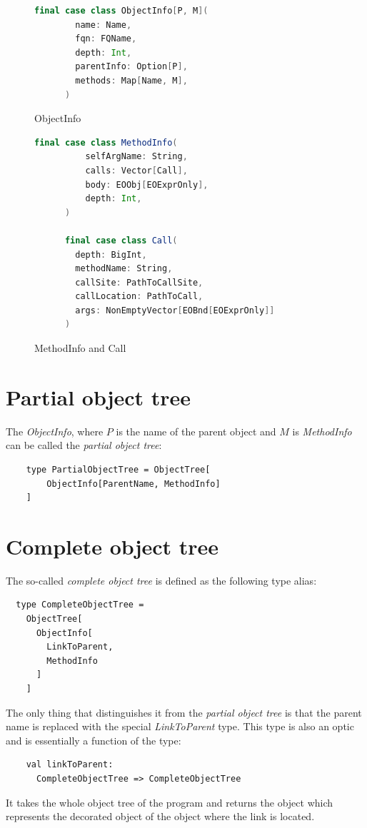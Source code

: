 \begin{figure}
    \begin{lstlisting}[language=Scala]
      final case class ObjectInfo[P, M](
        name: Name,
        fqn: FQName,
        depth: Int,
        parentInfo: Option[P],
        methods: Map[Name, M],
      )
    \end{lstlisting}
    \caption{ObjectInfo}
    \label{fig:objinfo}
\end{figure}

\begin{figure}
    \begin{lstlisting}[language=Scala]
      final case class MethodInfo(
          selfArgName: String,
          calls: Vector[Call],
          body: EOObj[EOExprOnly],
          depth: Int,
      )
          
      final case class Call(
        depth: BigInt,
        methodName: String,
        callSite: PathToCallSite,
        callLocation: PathToCall,
        args: NonEmptyVector[EOBnd[EOExprOnly]]
      )
    \end{lstlisting}
    \caption{MethodInfo and Call}
    \label{fig:methodinfo}
\end{figure}

\section{Partial object tree}
The \textit{ObjectInfo}, where $P$ is the name of the parent object and $M$ is \textit{MethodInfo} can be called the \textit{partial object tree}:
\begin{lstlisting}
    type PartialObjectTree = ObjectTree[
        ObjectInfo[ParentName, MethodInfo]
    ]

\end{lstlisting}

\section{Complete object tree}
\label{impl:complete_object_tree}
The so-called \textit{complete object tree} is defined as the following type alias:
\begin{lstlisting}
  type CompleteObjectTree =
    ObjectTree[
      ObjectInfo[
        LinkToParent,
        MethodInfo
      ]
    ]
\end{lstlisting}
The only thing that distinguishes it from the \textit{partial object tree} is that the parent name is replaced with the special \textit{LinkToParent} type. This type is also an optic \cite{optics} and is essentially a function of the type:
\begin{lstlisting}
    val linkToParent: 
      CompleteObjectTree => CompleteObjectTree
\end{lstlisting}
It takes the whole object tree of the program and returns the object which represents the decorated object of the object where the link is located.



